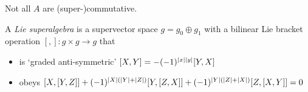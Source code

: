 Not all $A$  are (super-)commutative.
\begin{definition}
  A \emph{Lie superalgebra} is a supervector space $g = g_0 \oplus g_1$ with a bilinear Lie bracket operation $[, ]\colon g \times g \to g$ that
  \begin{itemize}
    \item is `graded anti-symmetric' $[X, Y] = - (-1)^{\abs{x} \abs{y}} [Y, X]$ 
    \item obeys $[X, [Y, Z]] + (-1)^{\abs{X}(\abs{Y} + \abs{Z})}[Y, [Z, X]] + (-1)^{\abs{Y}(\abs{Z} + \abs{X})}[Z, [X, Y]] = 0$
  \end{itemize}
\end{definition}

